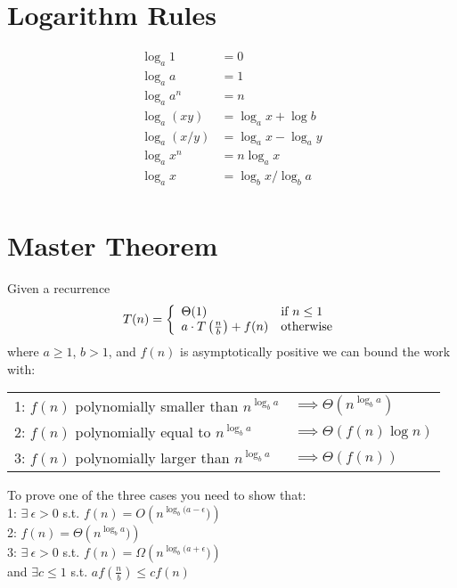 \documentclass[10pt]{article}
\begin{document}
\section{Logarithm Rules}

\begin{align*}
  \log_a 1 &= 0 \\
  \log_a a &= 1 \\
  \log_a a^n &= n \\
  \log_a (xy) &= \log_a x + \log b \\
  \log_a (x / y) &= \log_a x - \log_a y \\
  \log_a x^n &= n \log_a x \\
  \log_a x &= \log_b x / \log_b a \\
\end{align*}

\section{Master Theorem}
Given a recurrence 
$$T(n) = \left\{
  \begin{array}{l l}
    \Theta(1) & \text{if }n \leq 1 \\
    a\cdot T\left(\frac{n}{b}\right) + f(n) & \text{otherwise} \\
  \end{array}\right.$$
where
$a \geq 1$, $b > 1$, and $f(n)$ is asymptotically positive we can bound
the work with:


\begin{tabular}{l l}
1: $f(n)$ polynomially smaller than $n^{\log_b a}$ & $\implies \Theta(n^{\log_b a})$\\
2: $f(n)$ polynomially equal to $n^{\log_b a}$ & $\implies \Theta(f(n) \log n)$\\
3: $f(n)$ polynomially larger than $n^{\log_b a}$ & $\implies \Theta(f(n))$\\
\end{tabular}

To prove one of the three cases you need to show that: \\
1: $\exists \ \epsilon > 0$ s.t. $f(n) = O\left( n^{\log_b(a - \epsilon})\right)$ \\
2: $f(n) = \Theta\left( n^{\log_b a})\right)$ \\
3: $\exists \ \epsilon > 0$ s.t. $f(n) = \Omega\left( n^{\log_b(a + \epsilon})\right)$\\
and $\exists c \leq 1$ s.t. $af\left(\frac{n}{b}\right) \leq cf(n)$
\end{document}
